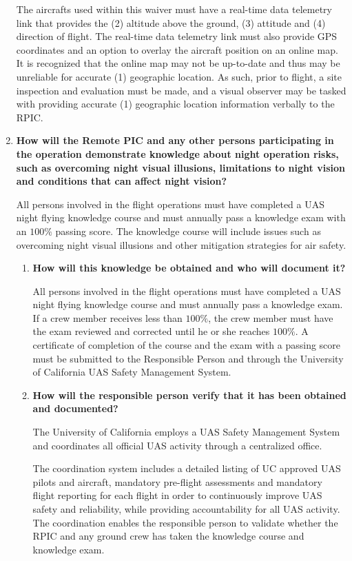 \documentclass[
]{book}
\begin{document}
\begin{enumerate}
  The aircrafts used within this waiver must have a real-time data telemetry link that provides the (2) altitude above the ground, (3) attitude and (4) direction of flight. The real-time data telemetry link must also provide GPS coordinates and an option to overlay the aircraft position on an online map. It is recognized that the online map may not be up-to-date and thus may be unreliable for accurate (1) geographic location. As such, prior to flight, a site inspection and evaluation must be made, and a visual observer may be tasked with providing accurate (1) geographic location information verbally to the RPIC.
\item
  \textbf{How will the Remote PIC and any other persons participating in the operation demonstrate knowledge about night operation risks, such as overcoming night visual illusions, limitations to night vision and conditions that can affect night vision?}

  All persons involved in the flight operations must have completed a UAS night flying knowledge course and must annually pass a knowledge exam with an \(100\%\) passing score. The knowledge course will include issues such as overcoming night visual illusions and other mitigation strategies for air safety.

  \begin{enumerate}
  \def\labelenumii{\arabic{enumii}.}
  \item
    \textbf{How will this knowledge be obtained and who will document it?}

    All persons involved in the flight operations must have completed a UAS night flying knowledge course and must annually pass a knowledge exam. If a crew member receives less than \(100\%\), the crew member must have the exam reviewed and corrected until he or she reaches \(100\%\). A certificate of completion of the course and the exam with a passing score must be submitted to the Responsible Person and through the University of California UAS Safety Management System.
  \item
    \textbf{How will the responsible person verify that it has been obtained and documented?}

    The University of California employs a UAS Safety Management System and coordinates all official UAS activity through a centralized office.

    The coordination system includes a detailed listing of UC approved UAS pilots and aircraft, mandatory pre-flight assessments and mandatory flight reporting for each flight in order to continuously improve UAS safety and reliability, while providing accountability for all UAS activity. The coordination enables the responsible person to validate whether the RPIC and any ground crew has taken the knowledge course and knowledge exam.


\end{enumerate}
\end{enumerate}
\end{document}
